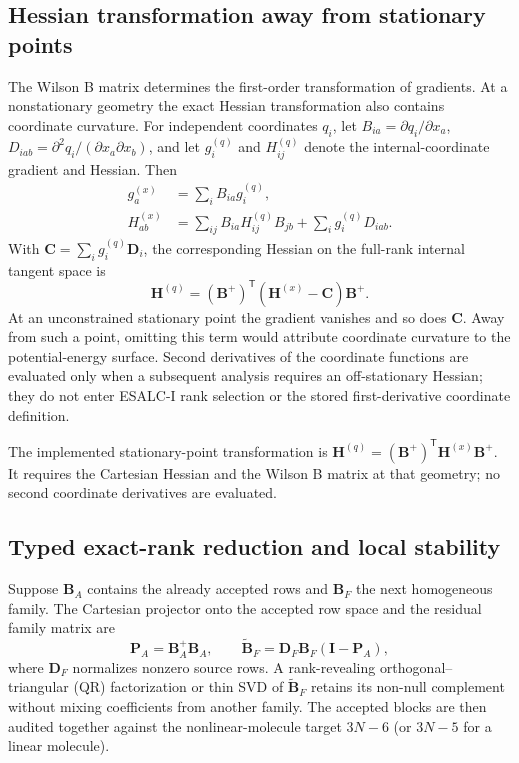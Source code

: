 \documentclass[10pt]{article}
\newcommand{\Bmat}{\mathbf{B}}
\begin{document}
\subsection{{Hessian transformation away from stationary points}}

{The Wilson B matrix determines the first-order transformation
of gradients. At a nonstationary geometry the exact Hessian transformation
also contains coordinate curvature. For independent coordinates \(q_i\), let
\(B_{ia}=\partial q_i/\partial x_a\),
\(D_{iab}=\partial^2q_i/(\partial x_a\partial x_b)\), and let
\(g_i^{(q)}\) and \(H_{ij}^{(q)}\) denote the internal-coordinate gradient
and Hessian. Then}
{
\begin{align}
g_a^{(x)} &= \sum_i B_{ia}g_i^{(q)}, \\
H_{ab}^{(x)} &= \sum_{ij}B_{ia}H_{ij}^{(q)}B_{jb}
                 + \sum_i g_i^{(q)}D_{iab}.
\end{align}
{With \(\mathbf C=\sum_i g_i^{(q)}\mathbf D_i\), the
corresponding Hessian on the full-rank internal tangent space is}
\[
\mathbf H^{(q)}=(\Bmat^+)^{\mathsf T}
                  (\mathbf H^{(x)}-\mathbf C)\Bmat^+ .
\]
}
{At an unconstrained stationary point the gradient vanishes
and so does \(\mathbf C\). Away from such a point, omitting this term would
attribute coordinate curvature to the potential-energy surface. Second
derivatives of the coordinate functions are evaluated only when a subsequent
analysis requires an off-stationary Hessian; they do not enter ESALC-I rank
selection or the stored first-derivative coordinate definition.}

{The implemented stationary-point transformation is
\(\mathbf H^{(q)}=(\Bmat^+)^{\mathsf T}\mathbf H^{(x)}\Bmat^+\).
It requires the Cartesian Hessian and the Wilson B matrix at that geometry;
no second coordinate derivatives are evaluated.}

\subsection{Typed exact-rank reduction and local stability}

Suppose \(\Bmat_A\) contains the already accepted rows and \(\Bmat_F\) the
next homogeneous family.  The Cartesian projector onto the accepted row space
and the residual family matrix are
\[
 \mathbf P_A=\Bmat_A^+\Bmat_A,
 \qquad
 \widetilde{\Bmat}_F=\mathbf D_F\Bmat_F(\mathbf I-\mathbf P_A),
\]
where \(\mathbf D_F\) normalizes nonzero source rows.  A rank-revealing
{orthogonal--triangular (QR) factorization} or
thin SVD of \(\widetilde{\Bmat}_F\) retains its non-null complement without
mixing coefficients from another family.  The accepted blocks are then
audited together against the nonlinear-molecule target \(3N-6\) (or \(3N-5\)
for a linear molecule).
\end{document}
